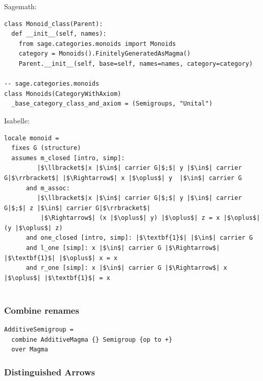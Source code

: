 \documentclass[t,10pt,numbers,fleqn,usenames,xcolor=dvipsnames]{beamer}
\begin{document}
\begin{frame}[fragile] 
Sagemath: 
\begin{verbatim}
class Monoid_class(Parent):
  def __init__(self, names):
    from sage.categories.monoids import Monoids
    category = Monoids().FinitelyGeneratedAsMagma()
    Parent.__init__(self, base=self, names=names, category=category)

-- sage.categories.monoids 
class Monoids(CategoryWithAxiom)
  _base_category_class_and_axiom = (Semigroups, "Unital")
\end{verbatim}
Isabelle: 
\begin{verbatim}
locale monoid =
  fixes G (structure)
  assumes m_closed [intro, simp]:
         |$\llbracket$|x |$\in$| carrier G|$;$| y |$\in$| carrier G|$\rrbracket$| |$\Rightarrow$| x |$\oplus$| y  |$\in$| carrier G
      and m_assoc:
         |$\llbracket$|x |$\in$| carrier G|$;$| y |$\in$| carrier G|$;$| z |$\in$| carrier G|$\rrbracket$|
          |$\Rightarrow$| (x |$\oplus$| y) |$\oplus$| z = x |$\oplus$| (y |$\oplus$| z)
      and one_closed [intro, simp]: |$\textbf{1}$| |$\in$| carrier G
      and l_one [simp]: x |$\in$| carrier G |$\Rightarrow$| |$\textbf{1}$| |$\oplus$| x = x
      and r_one [simp]: x |$\in$| carrier G |$\Rightarrow$| x |$\oplus$| |$\textbf{1}$| = x
        
\end{verbatim} 
\end{frame}

\begin{frame}[fragile]
\frametitle{Combine renames}
{\scriptsize
}
\vspace{0.5cm}
\begin{verbatim} 
AdditiveSemigroup = 
  combine AdditiveMagma {} Semigroup {op to +}
  over Magma 
\end{verbatim}
\end{frame}

\begin{frame}[fragile] 
\frametitle{Distinguished Arrows}
{\scriptsize
{}}
\end{frame}
\end{document}
